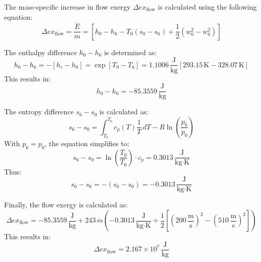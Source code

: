 The mass-specific increase in flow exergy \( \Delta ex_{\text{flow}} \) is calculated using the following equation:  
\[
\Delta ex_{\text{flow}} = \frac{\dot{E}}{\dot{m}} = \left[h_0 - h_6 - T_0 \left(s_0 - s_6\right) + \frac{1}{2} \left(w_0^2 - w_6^2\right)\right]
\]  

The enthalpy difference \( h_0 - h_6 \) is determined as:  
\[
h_0 - h_6 = -\left[h_c - h_0\right] = \exp\left[T_0 - T_6\right] = 1.1006 \, \frac{\text{J}}{\text{kg}} \left[293.15 \, \text{K} - 328.07 \, \text{K}\right]
\]  
This results in:  
\[
h_0 - h_6 = -85.3559 \, \frac{\text{J}}{\text{kg}}
\]  

The entropy difference \( s_6 - s_0 \) is calculated as:  
\[
s_6 - s_0 = \int_{T_0}^{T_6} c_p(T) \frac{1}{T} \, dT - R \ln\left(\frac{p_6}{p_0}\right)
\]  
With \( p_6 = p_0 \), the equation simplifies to:  
\[
s_6 - s_0 = \ln\left(\frac{T_0}{T_6}\right) \cdot c_p = 0.3013 \, \frac{\text{J}}{\text{kg·K}}
\]  
Thus:  
\[
s_0 - s_6 = -\left(s_6 - s_0\right) = -0.3013 \, \frac{\text{J}}{\text{kg·K}}
\]  

Finally, the flow exergy is calculated as:  
\[
\Delta ex_{\text{flow}} = -85.3559 \, \frac{\text{J}}{\text{kg}} + 243 \, \dot{m} \left(-0.3013 \, \frac{\text{J}}{\text{kg·K}} + \frac{1}{2} \left[\left(200 \, \frac{\text{m}}{\text{s}}\right)^2 - \left(510 \, \frac{\text{m}}{\text{s}}\right)^2\right]\right)
\]  
This results in:  
\[
\Delta ex_{\text{flow}} = 2.167 \times 10^7 \, \frac{\text{J}}{\text{kg}}
\]